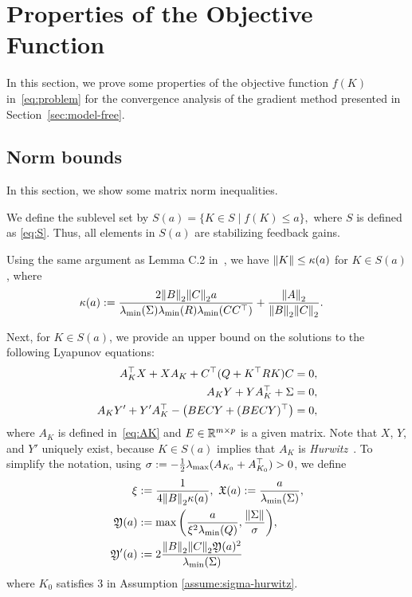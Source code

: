 % 
\section{Properties of the Objective Function}\label{sec:properties}
In this section, we prove some properties of the objective function $f(K)$ in~\eqref{eq:problem}
for the convergence analysis of the gradient method presented in Section~\ref{sec:model-free}.


\subsection{Norm bounds}
In this section, we show some matrix norm inequalities.

We define the sublevel set by
$
  S(a) = \{K \in S \mid f(K)\leq a\},
$
where $S$ is defined as \eqref{eq:S}. Thus, all elements in $S(a)$ are stabilizing feedback gains.

Using the same argument as Lemma C.2 in~\cite{fatkhullin2021optimizing}, we have $\norm{K}\leq \kappa(a)$ for $K\in S(a)$, where
\begin{align}
    \kappa(a)&:=\frac{2\norm{B}_2\norm{C}_2a}{\lambda_{\min}{(\Sigma)}\lambda_{\min}{(R)}\lambda_{\min}{(CC^\top})}+\frac{\norm{A}_2}{\norm{B}_2\norm{C}_2}.
\end{align}

Next, for $K \in S(a)$,
we provide an upper bound on the solutions to the following Lyapunov equations:
\begin{align}
  A_K^\top X + X A_K + C^\top(Q+K^\top R K)C   & = 0, \label{eq:lyapunovX}     \\
  A_K Y + Y A_K^\top + \Sigma                  & = 0, \label{eq:lyapunovY}     \\
  A_K Y' + Y'A_K^\top - \qty(BECY+(BECY)^\top) & = 0,\label{eq:lyapunovYprime}
\end{align}
where $A_K$ is defined in~\eqref{eq:AK} and $E \in \mathbb{R}^{m\times p}$ is a given matrix.
Note that $X$, $Y$, and $Y'$ uniquely exist, because
$K \in S(a)$ implies that
$A_K$ is \textit{Hurwitz}~\cite{bellman1957notes}.
To simplify the notation,
using $\sigma := -\frac{1}{2}\lambda_{\max}(A_{K_0}+A_{K_0}^\top)>0$,
we define
\begin{align}
  \xi & := \frac{1}{4\norm{B}_2\kappa(a)},\,\, \mathfrak{X}(a) :=\frac{a}{\lambda_{\min}(\Sigma)},   \label{eq:frakX} \\
  \mathfrak{Y}(a)  & :=\max\qty(\frac{a}{\xi^2\lambda_{\min}(Q)}, \frac{\norm{\Sigma}}{\sigma}),                               \label{eq:frakY}\\
  \mathfrak{Y}'(a) &:=2\frac{\norm{B}_2\norm{C}_2\mathfrak{Y}(a)^2}{\lambda_{\min}(\Sigma)}\label{eq:frakYprime}
\end{align}
where $K_0$ satisfies 3 in Assumption \ref{assume:sigma-hurwitz}.



